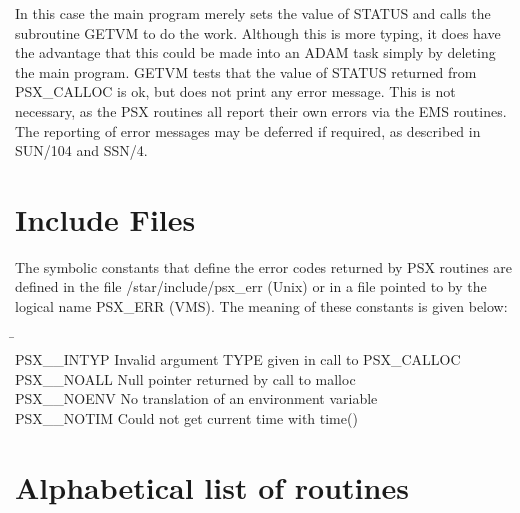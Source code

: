 In this case the main program merely sets the value of STATUS and calls the
subroutine GETVM to do the work. Although this is more typing, it does have the
advantage that this could be made into an ADAM task simply by deleting the main
program. GETVM tests that the value of STATUS returned from PSX\_CALLOC is ok,
but does not print any error message. This is not necessary, as the PSX
routines all report their own errors via the EMS routines. The reporting of
error messages may be deferred if required, as described in SUN/104 and SSN/4.

\section{Include Files}
\label{include}

The symbolic constants that define the error codes returned by PSX routines are
defined in the file /star/include/psx\_err (Unix) or in a file pointed to by
the logical name PSX\_ERR (VMS). The meaning of these constants is given below:

\begin{center}
\begin{tabbing}
\makebox[10em]{}\=\mbox{}\\
PSX\_\_INTYP \> Invalid argument TYPE given in call to PSX\_CALLOC \\
PSX\_\_NOALL \> Null pointer returned by call to malloc \\
PSX\_\_NOENV \> No translation of an environment variable \\
PSX\_\_NOTIM \> Could not get current time with time() \\
\end{tabbing}
\end{center}

\newpage
\section{Alphabetical list of routines}


\newcommand{\noteroutine}[2]{{\small \bf #1} \nopagebreak \\
                             \hspace*{3em} {\em #2} \\[1.5ex]}


